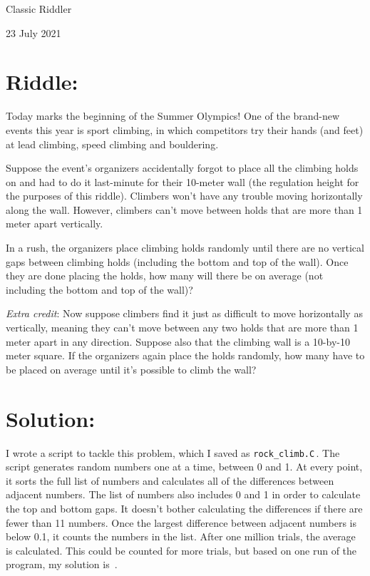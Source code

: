 \documentclass{article}
\begin{document}
\pagestyle{empty} %

\begin{center}
{\LARGE Classic Riddler}

\vspace{0.15in}

{\Large 23 July 2021}
\end{center}


\section*{Riddle:}

Today marks the beginning of the Summer Olympics!
One of the brand-new events this year is sport climbing, in which competitors try their hands (and feet) at lead climbing, speed climbing and bouldering.

Suppose the event's organizers accidentally forgot to place all the climbing holds on and had to do it last-minute for their 10-meter wall (the regulation height for the purposes of this riddle).
Climbers won't have any trouble moving horizontally along the wall.
However, climbers can't move between holds that are more than 1 meter apart vertically.

In a rush, the organizers place climbing holds randomly until there are no vertical gaps between climbing holds (including the bottom and top of the wall).
Once they are done placing the holds, how many will there be on average (not including the bottom and top of the wall)?

\textit{Extra credit}: Now suppose climbers find it just as difficult to move horizontally as vertically, meaning they can't move between any two holds that are more than 1 meter apart in any direction.
Suppose also that the climbing wall is a 10-by-10 meter square.
If the organizers again place the holds randomly, how many have to be placed on average until it's possible to climb the wall?



\section*{Solution:}

I wrote a script to tackle this problem, which I saved as \texttt{rock\_climb.C}\,.
The script generates random numbers one at a time, between 0 and 1.
At every point, it sorts the full list of numbers and calculates all of the differences between adjacent numbers.
The list of numbers also includes 0 and 1 in order to calculate the top and bottom gaps.
It doesn't bother calculating the differences if there are fewer than 11 numbers.
Once the largest difference between adjacent numbers is below 0.1, it counts the numbers in the list.
After one million trials, the average is calculated.
This could be counted for more trials, but based on one run of the program, my solution is
\,.
\end{document}
